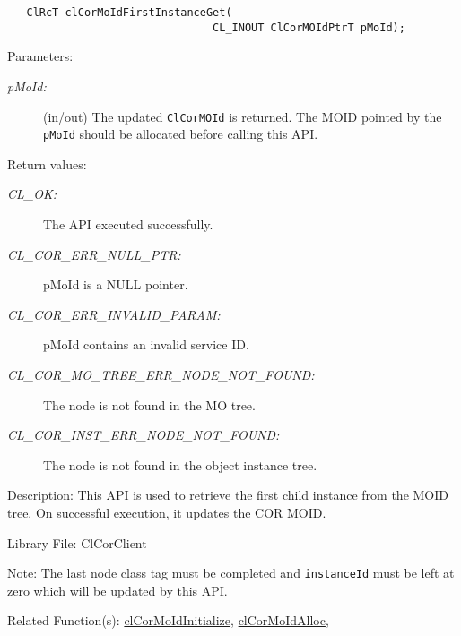 \begin{flushleft}
\begin{Desc}
\footnotesize\begin{verbatim}   ClRcT clCorMoIdFirstInstanceGet(
                         		CL_INOUT ClCorMOIdPtrT pMoId);
\end{verbatim}
\normalsize
\end{Desc}
\begin{Desc}
\item[Parameters:]
\begin{description}
\item[{\em p\-MoId:}](in/out) The updated {\tt{ClCorMOId}} is returned. The MOID pointed by the {\tt{pMoId}} should be allocated before
calling this API.
\end{description}
\end{Desc}
\begin{Desc}
\item[Return values:]
\begin{description}
\item[{\em CL\_\-OK:}]The API executed successfully.
\item[{\em CL\_\-COR\_\-ERR\_\-NULL\_\-PTR:}] pMoId is a NULL pointer.
\item[{\em CL\_\-COR\_\-ERR\_\-INVALID\_\-PARAM:}] pMoId contains an invalid service ID.
\item[{\em CL\_\-COR\_\-MO\_\-TREE\_\-ERR\_\-NODE\_\-NOT\_\-FOUND:}] The node is not found in the MO tree.
\item[{\em CL\_\-COR\_\-INST\_\-ERR\_\-NODE\_\-NOT\_\-FOUND:}] The node is not found in the object instance tree.
\end{description}
\end{Desc}
\begin{Desc}
\item[Description:]This API is used to retrieve the first child instance from the MOID tree. On successful execution, it updates the
COR MOID.\end{Desc}
\begin{Desc}
\item[Library File:]Cl\-Cor\-Client\end{Desc}
\begin{Desc}
\item[Note:]The last node class tag must be completed and {\tt{instanceId}} must be left at zero which will be updated by this API.\end{Desc}
\begin{Desc}
\item[Related Function(s):]\hyperlink{pagecor100}{cl\-Cor\-MoId\-Initialize}, \hyperlink{pagecor113}{cl\-Cor\-MoId\-Alloc}, 

\end{Desc}
\end{flushleft}
